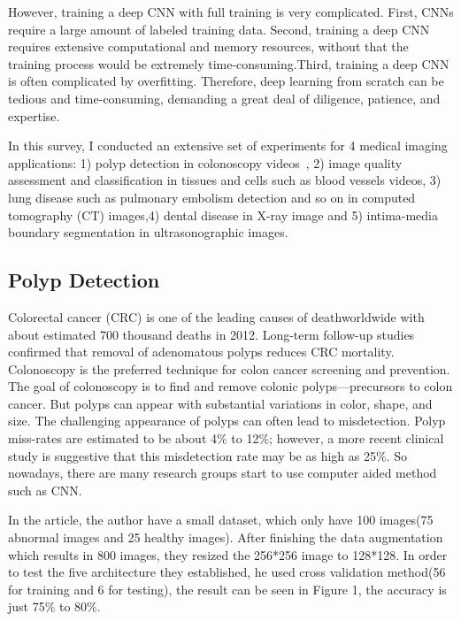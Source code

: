 \documentclass[10pt,twocolumn,letterpaper]{article}
\begin{document}
However, training a deep CNN with full training is very complicated. First, CNNs require a large
amount of labeled training data. Second, training a deep CNN requires extensive computational and memory resources, without that the training process would be extremely time-consuming.Third, training a deep CNN is often complicated by overfitting. Therefore, deep learning from scratch can be tedious and time-consuming, demanding a great deal of diligence, patience, and expertise.

In this survey, I conducted an extensive set of experiments for 4 medical imaging applications: 1) polyp detection in colonoscopy videos~\cite{ribeiro2016colonic}\cite{zhang2017automatic}, 2) image quality assessment and classification in tissues and cells such as blood vessels videos\cite{mcilroy2017vivo}\cite{li2017cell}\cite{huang2017epithelium}\cite{kieffer2017convolutional}\cite{hadad2017classification}\cite{araujo2017classification}, 3) lung disease such as pulmonary embolism detection and so on in computed tomography (CT) images\cite{shen2015multi}\cite{li2014medical},4) dental disease in X-ray image\cite{prajapaticlassification} and 5) intima-media boundary segmentation in ultrasonographic images\cite{roth2015anatomy}.

\subsection{Polyp Detection}

Colorectal cancer (CRC) is one of the leading causes of deathworldwide with about estimated 700 thousand deaths in 2012\cite{zhang2017automatic}. Long-term follow-up studies confirmed that removal of adenomatous polyps reduces CRC mortality. Colonoscopy is the preferred technique for colon cancer screening and prevention. The goal of colonoscopy is to find and remove colonic polyps—precursors to colon cancer. But polyps can appear with substantial variations in color, shape, and size. The challenging appearance of polyps can often lead to misdetection\cite{ribeiro2016colonic}. Polyp miss-rates are estimated to be about 4\% to 12\%; however, a more recent clinical study is suggestive that this misdetection rate may be as high as 25\%. So nowadays, there are many research groups start to use computer aided method such as CNN.

In the article\cite{ribeiro2016colonic}, the author have a small dataset, which only have 100 images(75 abnormal images and 25 healthy images). After finishing the data augmentation which results in 800 images, they resized the 256*256 image to 128*128. In order to test the five architecture they established, he used cross validation method(56 for training and 6 for testing), the result can be seen in Figure 1, the accuracy is just 75\% to 80\%.
\end{document}
